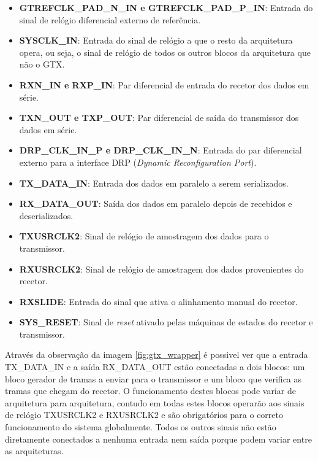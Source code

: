 \begin{itemize}
	\item \textbf{GTREFCLK\_PAD\_N\_IN e GTREFCLK\_PAD\_P\_IN}:  Entrada do sinal de relógio diferencial externo de referência.
	
	\item \textbf{SYSCLK\_IN}: Entrada do sinal de relógio a que o resto da arquitetura opera, ou seja, o sinal de relógio de todos os outros blocos da arquitetura que não o GTX.
	
	\item \textbf{RXN\_IN e RXP\_IN}: Par diferencial de entrada do recetor  dos dados em série.
	
	\item \textbf{TXN\_OUT e TXP\_OUT}: Par diferencial de saída do transmissor dos dados em série.

	\item \textbf{DRP\_CLK\_IN\_P e DRP\_CLK\_IN\_N}: Entrada do par diferencial externo para a interface DRP (\textit{Dynamic Reconfiguration Port}). 
	
	\item \textbf{TX\_DATA\_IN}: Entrada dos dados em paralelo a serem serializados.
	
	\item \textbf{RX\_DATA\_OUT}: Saída dos dados em paralelo depois de recebidos e deserializados. 
	
	\item \textbf{TXUSRCLK2}: Sinal de relógio de amostragem dos dados para o transmissor.
	
	\item \textbf{RXUSRCLK2}: Sinal de relógio de amostragem dos dados provenientes do recetor.
	
	\item \textbf{RXSLIDE}: Entrada do sinal que ativa o alinhamento manual do recetor.
	
	\item \textbf{SYS\_RESET}: Sinal de \textit{reset} ativado pelas máquinas de estados do recetor e transmissor.
	
\end{itemize}

Através da observação da imagem \ref{fig:gtx_wrapper} é possivel ver que a entrada TX\_DATA\_IN e a saída RX\_DATA\_OUT estão conectadas a dois blocos: um bloco gerador de tramas a enviar para o transmissor e um bloco que verifica as tramas que chegam do recetor. O funcionamento destes blocos pode variar de arquitetura para arquitetura, contudo em todas estes blocos operarão aos sinais de relógio TXUSRCLK2 e RXUSRCLK2 e são obrigatórios para o correto funcionamento do sistema globalmente.  Todos os outros sinais não estão diretamente conectados a nenhuma entrada nem saída porque podem variar entre as arquiteturas.

